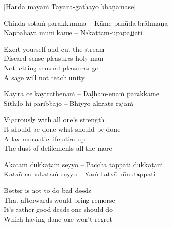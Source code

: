 \begin{center}
  [Handa mayaṁ Tāyana-gāthāyo bhaṇāmase]
\end{center}

\begin{twochants}
  Chinda sotaṁ parakkamma – Kāme panūda brāhmaṇa\\
  Nappahāya muni kāme – Nekattam-upapajjati\\
\end{twochants}

\begin{english}
  Exert yourself and cut the stream\\
  Discard sense pleasures holy man\\
  Not letting sensual pleasures go\\
  A sage will not reach unity
\end{english}

\begin{twochants}
  Kayirā ce kayirāthenaṁ – Daḷham-enaṁ parakkame\\
  Sithilo hi paribbājo – Bhiyyo ākirate rajaṁ\\
\end{twochants}

\begin{english}
  Vigorously with all one’s strength\\
  It should be done what should be done\\
  A lax monastic life stirs up\\
  The dust of defilements all the more
\end{english}

\begin{twochants}
  Akataṁ dukkaṭaṁ seyyo – Pacchā tappati dukkaṭaṁ\\
  Katañ-ca sukataṁ seyyo – Yaṁ katvā nānutappati\\
\end{twochants}

\begin{english}
  Better is not to do bad deeds\\
  That afterwards would bring remorse\\
  It’s rather good deeds one should do\\
  Which having done one won’t regret
\end{english}

